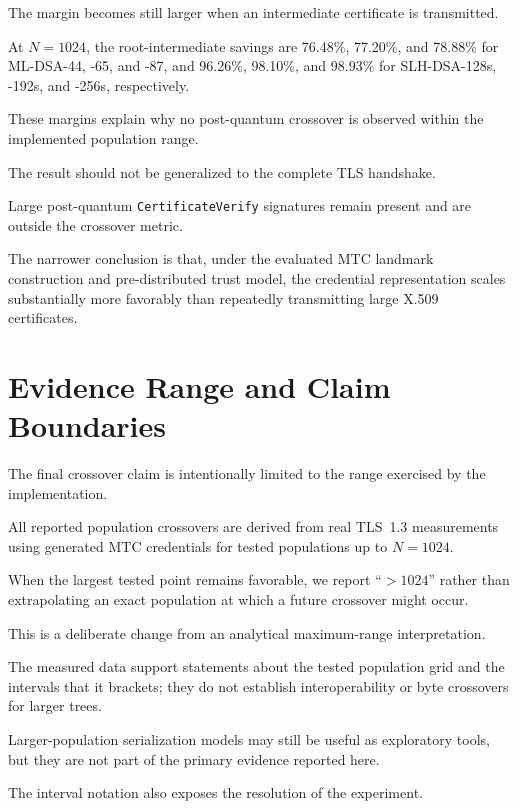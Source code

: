 \documentclass[journal]{IEEEtran}
\begin{document}
The margin becomes still larger when an intermediate certificate is transmitted.

At $N=1024$, the root-intermediate savings are 76.48\%, 77.20\%, and 78.88\% for ML-DSA-44, -65, and -87, and 96.26\%, 98.10\%, and 98.93\% for SLH-DSA-128s, -192s, and -256s, respectively.

These margins explain why no post-quantum crossover is observed within the implemented population range.



The result should not be generalized to the complete TLS handshake.

Large post-quantum \texttt{CertificateVerify} signatures remain present and are outside the crossover metric.

The narrower conclusion is that, under the evaluated MTC landmark construction and pre-distributed trust model, the credential representation scales substantially more favorably than repeatedly transmitting large X.509 certificates.



\section{Evidence Range and Claim Boundaries}



The final crossover claim is intentionally limited to the range exercised by the implementation.

All reported population crossovers are derived from real TLS~1.3 measurements using generated MTC credentials for tested populations up to $N=1024$.

When the largest tested point remains favorable, we report ``$>1024$'' rather than extrapolating an exact population at which a future crossover might occur.



This is a deliberate change from an analytical maximum-range interpretation.

The measured data support statements about the tested population grid and the intervals that it brackets; they do not establish interoperability or byte crossovers for larger trees.

Larger-population serialization models may still be useful as exploratory tools, but they are not part of the primary evidence reported here.



The interval notation also exposes the resolution of the experiment.
\end{document}
